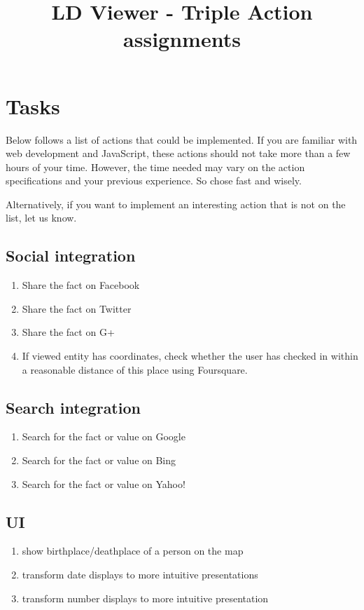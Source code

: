 \documentclass{article}
\begin{document}
\title{LD Viewer - Triple Action assignments}
\date{}
\maketitle



\section{Tasks}
Below follows a list of actions that could be implemented.
If you are familiar with web development and JavaScript, these actions should not take more than a few hours of your time.
However, the time needed may vary on the action specifications and your previous experience. So chose fast and wisely.

Alternatively, if you want to implement an interesting action that is not on the list, let us know.
\subsection{Social integration}
\begin{enumerate}
\item Share the fact on Facebook
\item Share the fact on Twitter
\item Share the fact on G+
\item If viewed entity has coordinates, check whether the user has checked in within a reasonable distance of this place using Foursquare.
\end{enumerate}

\subsection{Search integration}
\begin{enumerate}
\item Search for the fact or value on Google
\item Search for the fact or value on Bing
\item Search for the fact or value on Yahoo!
\end{enumerate}

\subsection{UI}
\begin{enumerate}
\item show birthplace/deathplace of a person on the map
\item transform date displays to more intuitive presentations
\item transform number displays to more intuitive presentation
\end{enumerate}
\end{document}
